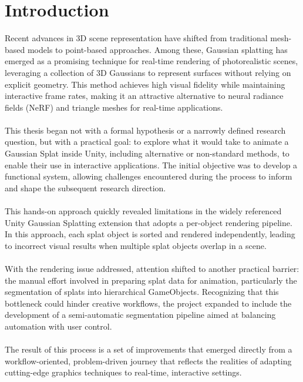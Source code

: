 \documentclass[12pt]{article}
\begin{document}
\section{Introduction}
Recent advances in 3D scene representation have shifted from traditional mesh-based models to point-based approaches. Among these, Gaussian splatting \parencite{OriginalSplatting} has emerged as a promising technique for real-time rendering of photorealistic scenes, leveraging a collection of 3D Gaussians to represent surfaces without relying on explicit geometry. This method achieves high visual fidelity while maintaining interactive frame rates, making it an attractive alternative to neural radiance fields (NeRF) and triangle meshes for real-time applications.
\\\\
This thesis began not with a formal hypothesis or a narrowly defined research question, but with a practical goal: to explore what it would take to animate a Gaussian Splat inside Unity, including alternative or non-standard methods, to enable their use in interactive applications. The initial objective was to develop a functional system, allowing challenges encountered during the process to inform and shape the subsequent research direction.
\\\\
This hands-on approach quickly revealed limitations in the widely referenced Unity Gaussian Splatting extension \parencite{Aras} that adopts a per-object rendering pipeline. In this approach, each splat object is sorted and rendered independently, leading to incorrect visual results when multiple splat objects overlap in a scene.
\\\\
With the rendering issue addressed, attention shifted to another practical barrier: the manual effort involved in preparing splat data for animation, particularly the segmentation of splats into hierarchical GameObjects. Recognizing that this bottleneck could hinder creative workflows, the project expanded to include the development of a semi-automatic segmentation pipeline aimed at balancing automation with user control.
\\\\
The result of this process is a set of improvements that emerged directly from a workflow-oriented, problem-driven journey that reflects the realities of adapting cutting-edge graphics techniques to real-time, interactive settings.
\\\\
\end{document}

